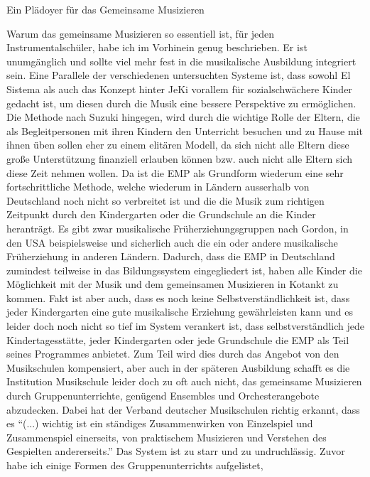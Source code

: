 Ein Plädoyer für das Gemeinsame Musizieren

Warum das gemeinsame Musizieren so essentiell ist, für jeden
Instrumentalschüler, habe ich im Vorhinein genug beschrieben. Er ist
unumgänglich und sollte viel mehr fest in die musikalische Ausbildung integriert
sein. Eine Parallele der verschiedenen untersuchten Systeme ist, dass sowohl El
Sistema als auch das Konzept hinter JeKi vorallem für sozialschwächere Kinder
gedacht ist, um diesen durch die Musik eine bessere Perspektive zu ermöglichen.
Die Methode nach Suzuki hingegen, wird durch die wichtige Rolle der Eltern, die
als Begleitpersonen mit ihren Kindern den Unterricht besuchen und zu Hause mit
ihnen üben sollen eher zu einem elitären Modell, da sich nicht alle Eltern diese
große Unterstützung finanziell erlauben können bzw. auch nicht alle Eltern sich
diese Zeit nehmen wollen. Da ist die EMP als Grundform wiederum eine sehr
fortschrittliche Methode, welche wiederum in Ländern ausserhalb von Deutschland
noch nicht so verbreitet ist und die die Musik zum richtigen Zeitpunkt durch den
Kindergarten oder die Grundschule an die Kinder heranträgt. Es gibt zwar
musikalische Früherziehungsgruppen nach Gordon, in den USA beispielsweise und
sicherlich auch die ein oder andere musikalische Früherziehung in anderen
Ländern. Dadurch, dass die EMP in Deutschland zumindest teilweise in das
Bildungssystem eingegliedert ist, haben alle Kinder die Möglichkeit mit der
Musik und dem gemeinsamen Musizieren in Kotankt zu kommen. Fakt ist aber auch,
dass es noch keine Selbstverständlichkeit ist, dass jeder Kindergarten eine gute
musikalische Erziehung gewährleisten kann und es leider doch noch nicht so tief
im System verankert ist, dass selbstverständlich jede Kindertagesstätte, jeder
Kindergarten oder jede Grundschule die EMP als Teil seines Programmes anbietet.
Zum Teil wird dies durch das Angebot von den Musikschulen kompensiert, aber auch
in der späteren Ausbildung schafft es die Institution Musikschule leider doch zu
oft auch nicht, das gemeinsame Musizieren durch Gruppenunterrichte, genügend
Ensembles und Orchesterangebote abzudecken. Dabei hat der Verband deutscher
Musikschulen richtig erkannt, dass es \enquote{(...) wichtig ist ein ständiges
Zusammenwirken von Einzelspiel und Zusammenspiel einerseits, von praktischem
Musizieren und Verstehen des Gespielten andererseits.}
\autocite[22]{losert:die_kunst_zu_unterrichten} Das System ist zu starr und zu
undruchlässig. Zuvor habe ich einige Formen des Gruppenunterrichts aufgelistet,
